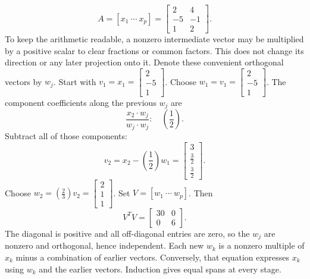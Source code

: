 \[A=[x_1\ \cdots\ x_p]=\left[\begin{array}{rr}2&4\\-5&-1\\1&2\end{array}\right].\]
To keep the arithmetic readable, a nonzero intermediate vector may be multiplied by a positive scalar to clear fractions or common factors. This does not change its direction or any later projection onto it. Denote these convenient orthogonal vectors by $w_j$.
Start with $v_1=x_1=\left[\begin{array}{r}2\\-5\\1\end{array}\right]$.
Choose $w_{1}=v_{1}=\left[\begin{array}{r}2\\-5\\1\end{array}\right]$.
The component coefficients along the previous $w_j$ are
\[\frac{x_{2}\cdot w_j}{w_j\cdot w_j}:\quad(\frac{1}{2}).\]
Subtract all of those components:
\[v_{2}=x_{2}-(\frac{1}{2})w_{1}=\left[\begin{array}{r}3\\\frac{3}{2}\\\frac{3}{2}\end{array}\right].\]
Choose $w_{2}=(\frac{2}{3})v_{2}=\left[\begin{array}{r}2\\1\\1\end{array}\right]$.
Set $V=[w_1\ \cdots\ w_p]$. Then
\[V^TV=\left[\begin{array}{rr}30&0\\0&6\end{array}\right].\]
The diagonal is positive and all off-diagonal entries are zero, so the $w_j$ are nonzero and orthogonal, hence independent. Each new $w_k$ is a nonzero multiple of $x_k$ minus a combination of earlier vectors. Conversely, that equation expresses $x_k$ using $w_k$ and the earlier vectors. Induction gives equal spans at every stage.

